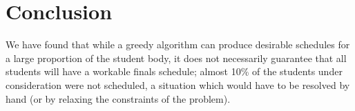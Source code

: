 \documentclass{article}
\begin{document}
\section{Conclusion}

We have found that while a greedy algorithm can produce desirable schedules for a large proportion of the student body, it does not necessarily guarantee that all students will have a workable finals schedule; almost 10\% of the students under consideration were not scheduled, a situation which would have to be resolved by hand (or by relaxing the constraints of the problem).
\end{document}

